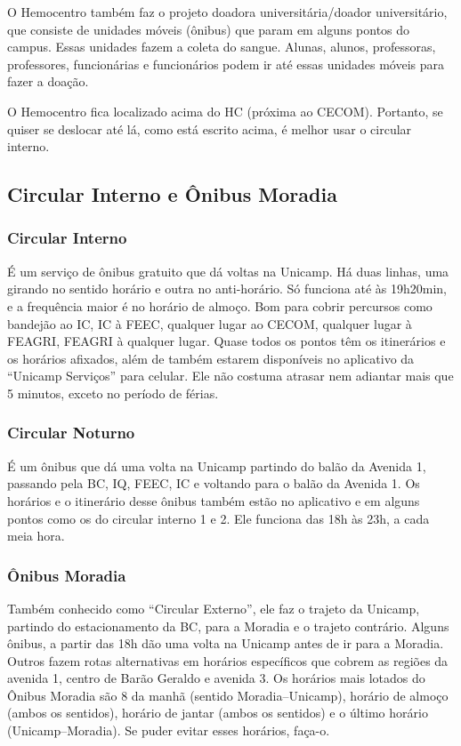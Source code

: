 O Hemocentro também faz o projeto doadora universitária/doador universitário,
que consiste de unidades móveis (ônibus) que param em alguns pontos do campus.
Essas unidades fazem a coleta do sangue. Alunas, alunos, professoras,
professores, funcionárias e funcionários podem ir até essas unidades móveis
para fazer a doação.

O Hemocentro fica localizado acima do HC (próxima ao CECOM). Portanto, se
quiser se deslocar até lá, como está escrito acima, é melhor usar o circular
interno.

\subsection{Circular Interno e Ônibus Moradia}

\subsubsection{Circular Interno}
É um serviço de ônibus gratuito que dá voltas na Unicamp. Há duas linhas, uma
girando no sentido horário e outra no anti-horário. Só funciona até às
19h20min, e a frequência maior é no horário de almoço. Bom para cobrir
percursos como bandejão ao IC, IC à FEEC, qualquer lugar ao CECOM, qualquer
lugar à FEAGRI, FEAGRI à qualquer lugar. Quase todos os pontos têm os
itinerários e os horários afixados, além de também estarem disponíveis no
aplicativo da ``Unicamp Serviços'' para celular. Ele não costuma atrasar nem
adiantar mais que 5 minutos, exceto no período de férias.

\subsubsection{Circular Noturno}
É um ônibus que dá uma volta na Unicamp partindo do balão da Avenida 1,
passando pela BC, IQ, FEEC, IC e voltando para o balão da Avenida 1. Os
horários e o itinerário desse ônibus também estão no aplicativo e em alguns
pontos como os do circular interno 1 e 2. Ele funciona das 18h às 23h, a cada
meia hora.

\subsubsection{Ônibus Moradia}
Também conhecido como ``Circular Externo'', ele faz o trajeto da Unicamp,
partindo do estacionamento da BC, para a Moradia e o trajeto contrário. Alguns
ônibus, a partir das 18h dão uma volta na Unicamp antes de ir para a Moradia.
Outros fazem rotas alternativas em horários específicos que cobrem as regiões
da avenida 1, centro de Barão Geraldo e avenida 3. Os horários mais lotados do
Ônibus Moradia são 8 da manhã (sentido Moradia--Unicamp), horário de almoço
(ambos os sentidos), horário de jantar (ambos os sentidos) e o último horário
(Unicamp--Moradia). Se puder evitar esses horários, faça-o.

